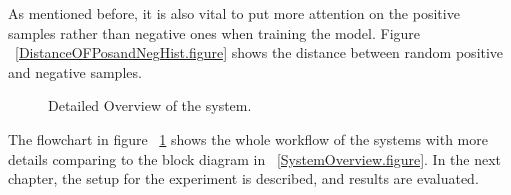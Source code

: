 As mentioned before, it is also vital to put more attention on the positive samples rather than negative ones when training the model. Figure ~\ref{DistanceOFPosandNegHist.figure} shows the distance between random positive and negative samples.


\begin{figure}[t]
  \caption[Detailed Overview of the system]
  {Detailed Overview of the system.}
  \label{DetailedOverview.figure}
\end{figure}




The flowchart in figure ~\ref{DetailedOverview.figure} shows the whole workflow of the systems with more details comparing to the block diagram in ~\ref{SystemOverview.figure}.
In the next chapter, the setup for the experiment is described, and results are evaluated.


